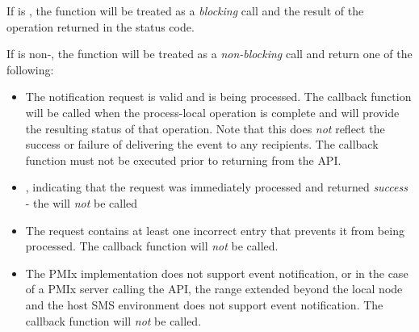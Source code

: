 \begin{arglist}
\end{arglist}

If  is , the function will be treated as a \emph{blocking} call and the result of the operation returned in the status code.

If  is non-, the function will be treated as a \emph{non-blocking} call and return one of the following:

\begin{itemize}
\item {} The notification request is valid and is being processed. The callback function will be called when the process-local operation is complete and will provide the resulting status of that operation. Note that this does \textit{not} reflect the success or failure of delivering the event to any recipients. The callback function must not be executed prior to returning from the \ac{API}.
\item {}, indicating that the request was immediately processed and returned \textit{success} - the  will \textit{not} be called
\item {} The request contains at least one incorrect entry that prevents it from being processed. The callback function will \textit{not} be called.
\item {} The \ac{PMIx} implementation does not support event notification, or in the case of a \ac{PMIx} server calling the API, the range extended beyond the local node and the host \ac{SMS} environment does not support event notification. The callback function will \textit{not} be called.
\end{itemize}


